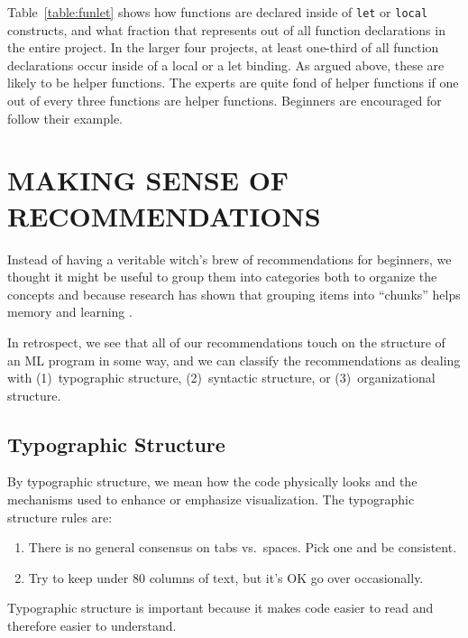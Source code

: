 \documentclass[12pt,abstracton]{scrartcl}
\begin{document}
Table~\ref{table:funlet} shows how functions are declared inside of \texttt{let} or \texttt{local}
constructs, and what fraction that represents out of all function declarations in the
entire project.
In the larger four projects, at least one-third of all function declarations occur
inside of a local or a let binding. As argued above, these are likely to be helper functions.
The experts are quite fond of helper functions if one out of every three functions
are helper functions. Beginners are encouraged for follow their example.
\section{MAKING SENSE OF RECOMMENDATIONS}\label{sec:rec}
Instead of having a veritable witch's brew of recommendations for beginners,
we thought it might be useful to group them into categories both to
organize the concepts and because research has shown that grouping items into
``chunks'' helps memory and learning \cite{Gob01}.

In retrospect, we see that all of our recommendations touch on the structure of
an ML program in some way, and we can classify the recommendations as dealing
with (1)~typographic structure, (2)~syntactic structure, or (3)~organizational structure.
\subsection{Typographic Structure}
By typographic structure, we mean how the code physically looks and the mechanisms
used to enhance or emphasize visualization. The typographic structure rules are:
\begin{enumerate}
\item There is no general consensus on tabs vs.\ spaces. Pick one and be consistent.
\item Try to keep under 80 columns of text, but it's OK go over occasionally.
\end{enumerate}
Typographic structure is important because it makes code easier to read and therefore
easier to understand.
\end{document}
